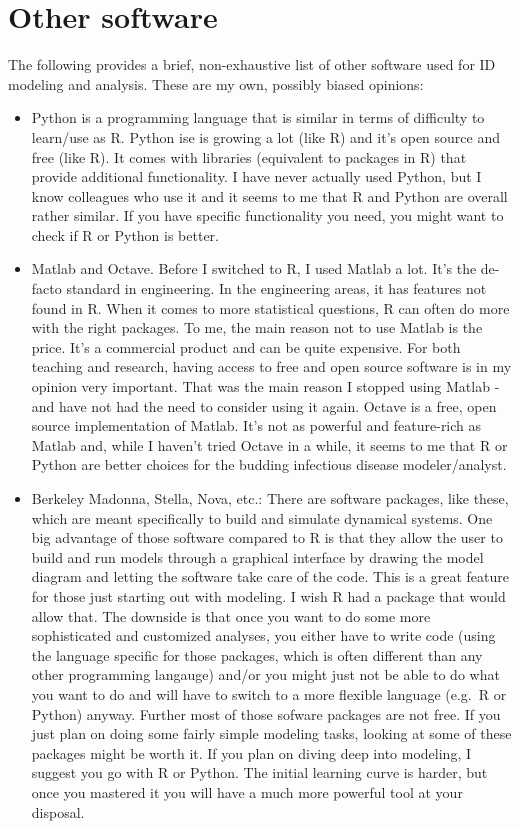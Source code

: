 \documentclass[
]{book}
\begin{document}
\hypertarget{other-software}{%
\section{Other software}\label{other-software}}

The following provides a brief, non-exhaustive list of other software used for ID modeling and analysis. These are my own, possibly biased opinions:

\begin{itemize}
\item
  Python is a programming language that is similar in terms of difficulty to learn/use as R. Python ise is growing a lot (like R) and it's open source and free (like R). It comes with libraries (equivalent to packages in R) that provide additional functionality. I have never actually used Python, but I know colleagues who use it and it seems to me that R and Python are overall rather similar. If you have specific functionality you need, you might want to check if R or Python is better.
\item
  Matlab and Octave. Before I switched to R, I used Matlab a lot. It's the de-facto standard in engineering. In the engineering areas, it has features not found in R. When it comes to more statistical questions, R can often do more with the right packages. To me, the main reason not to use Matlab is the price. It's a commercial product and can be quite expensive. For both teaching and research, having access to free and open source software is in my opinion very important. That was the main reason I stopped using Matlab - and have not had the need to consider using it again. Octave is a free, open source implementation of Matlab. It's not as powerful and feature-rich as Matlab and, while I haven't tried Octave in a while, it seems to me that R or Python are better choices for the budding infectious disease modeler/analyst.
\item
  Berkeley Madonna, Stella, Nova, etc.: There are software packages, like these, which are meant specifically to build and simulate dynamical systems. One big advantage of those software compared to R is that they allow the user to build and run models through a graphical interface by drawing the model diagram and letting the software take care of the code. This is a great feature for those just starting out with modeling. I wish R had a package that would allow that. The downside is that once you want to do some more sophisticated and customized analyses, you either have to write code (using the language specific for those packages, which is often different than any other programming langauge) and/or you might just not be able to do what you want to do and will have to switch to a more flexible language (e.g.~R or Python) anyway. Further most of those sofware packages are not free. If you just plan on doing some fairly simple modeling tasks, looking at some of these packages might be worth it. If you plan on diving deep into modeling, I suggest you go with R or Python. The initial learning curve is harder, but once you mastered it you will have a much more powerful tool at your disposal.

\end{itemize}
\end{document}
